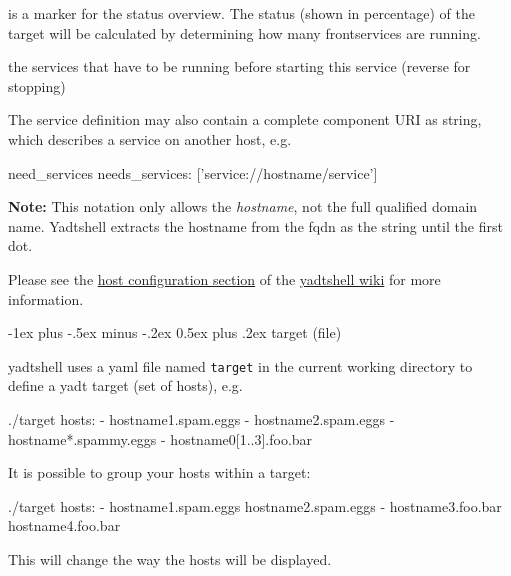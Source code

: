 \documentclass[10pt,landscape]{article}
\makeatletter
\renewcommand{\section}{\@startsection{section}{1}{0mm}%
                                {-1ex plus -.5ex minus -.2ex}%
                                {0.5ex plus .2ex}%
                                {\normalfont\large\bfseries}}
\newcommand{\note}[1]{\medskip\textbf{Note:} {#1}\medskip}
\makeatother
\begin{document}
\begin{multicols}{3}
\begin{description}[font=\bfseries,leftmargin=1cm,style=sameline]
    \item [is\_frontservice]
    is a marker for the status overview. The status
    (shown in percentage) of the target will be
    calculated by determining how many
    frontservices are running.
\item [needs\_services]
    the services that have to be running before
    starting this service (reverse for stopping)
\end{description}

The service definition may also contain a complete component URI as string,
which describes a service on another host, e.g.

\begin{examples}{need\_services}
needs_services: ['service://hostname/service']
\end{examples}

\note{This notation only allows the \emph{hostname},
not the full qualified domain name. Yadtshell extracts the hostname from
the fqdn as the string until the first dot.}

Please see the
\href{https://github.com/yadt/yadtshell/wiki/Host-Configuration}{host configuration section}
of the \href{https://github.com/yadt/yadtshell/wiki}{yadtshell wiki}
for more information.



\section{target (file)}

yadtshell uses a yaml file named
\verb+target+ in the current working directory to define a yadt target (set of hosts), e.g.

\begin{examples}{./target}
hosts:
- hostname1.spam.eggs
- hostname2.spam.eggs
- hostname*.spammy.eggs
- hostname0[1..3].foo.bar
\end{examples}

It is possible to group your hosts within a target:

\begin{examples}{./target}
hosts:
- hostname1.spam.eggs hostname2.spam.eggs
- hostname3.foo.bar hostname4.foo.bar
\end{examples}

This will change the way the hosts will be displayed.




\end{multicols}
\end{document}
